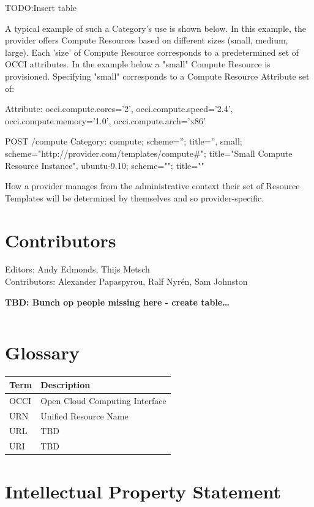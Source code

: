 \documentclass[10pt,a4paper]{article}
\begin{document}
TODO:Insert table

A typical example of such a Category's use is shown below. In this example, the provider offers Compute Resources based on different sizes (small, medium, large). Each 'size' of Compute Resource corresponds to a predetermined set of OCCI attributes. In the example below a "small" Compute Resource is provisioned. Specifying "small" corresponds to a Compute Resource Attribute set of:

Attribute: occi.compute.cores='2', occi.compute.speed='2.4', occi.compute.memory='1.0', occi.compute.arch='x86'

POST /compute
Category: compute; scheme=''; title='', small; scheme="http://provider.com/templates/compute\#"; title="Small Compute Resource Instance", ubuntu-9.10; scheme=""; title=""

How a provider manages from the administrative context their set of Resource Templates will be determined by themselves and so provider-specific.


\section{Contributors}

Editors: Andy Edmonds, Thijs Metsch \\
Contributors: Alexander Papaspyrou, Ralf Nyr\'en, Sam Johnston

\textbf{TBD: Bunch op people missing here - create table\ldots}

\begin{verbatim}

\end{verbatim}

\section{Glossary}

\begin{tabular}{l|l}
Term & Description \\
\hline
OCCI & Open Cloud Computing Interface \\
URN & Unified Resource Name \\
URL & TBD \\
URI & TBD \\
\end{tabular}

\section{Intellectual Property Statement}
\end{document}
